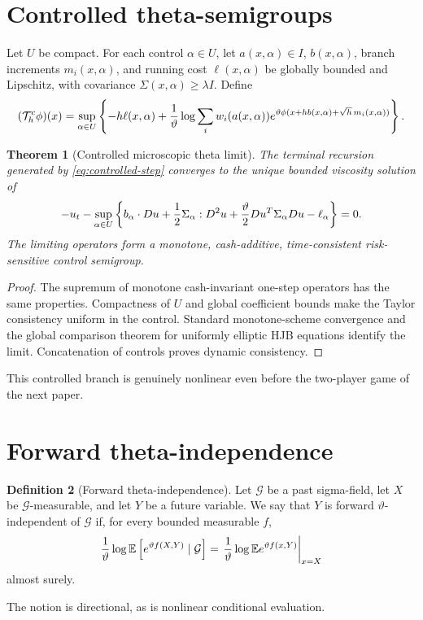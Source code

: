 \documentclass[11pt,reqno]{amsart}
\newtheorem{theorem}{Theorem}[section]
\theoremstyle{definition}
\newtheorem{definition}[theorem]{Definition}
\theoremstyle{remark}
\newcommand{\E}{\mathbb E}
\begin{document}
\section{Controlled theta-semigroups}

Let $U$ be compact.  For each control $\alpha\in U$, let
$a(x,\alpha)\in I$, $b(x,\alpha)$, branch increments $m_i(x,\alpha)$, and
running cost $\ell(x,\alpha)$ be globally bounded and Lipschitz, with covariance
$\Sigma(x,\alpha)\ge\lambda I$.  Define
\begin{equation}\label{eq:controlled-step}
 (\mathcal T_h^c\phi)(x)=
 \sup_{\alpha\in U}\left\{-h\ell(x,\alpha)
 +{1\over\vartheta}\log\sum_iw_i(a(x,\alpha))
 e^{\vartheta\phi(x+hb(x,\alpha)+\sqrt h\,m_i(x,\alpha))}
 \right\}.
\end{equation}

\begin{theorem}[Controlled microscopic theta limit]\label{thm:controlled}
The terminal recursion generated by \eqref{eq:controlled-step} converges to the
unique bounded viscosity solution of
\begin{equation}\label{eq:controlled-HJB}
 -u_t-\sup_{\alpha\in U}\left\{
 b_\alpha\cdot Du+{1\over2}\Sigma_\alpha:D^2u
 +{\vartheta\over2}Du^T\Sigma_\alpha Du-\ell_\alpha
 \right\}=0.
\end{equation}
The limiting operators form a monotone, cash-additive, time-consistent
risk-sensitive control semigroup.
\end{theorem}

\begin{proof}
The supremum of monotone cash-invariant one-step operators has the same
properties.  Compactness of $U$ and global coefficient bounds make the Taylor
consistency uniform in the control.  Standard monotone-scheme convergence and
the global comparison theorem for uniformly elliptic HJB equations identify
the limit.  Concatenation of controls proves dynamic consistency.
\end{proof}

This controlled branch is genuinely nonlinear even before the two-player game
of the next paper.

\section{Forward theta-independence}

\begin{definition}[Forward theta-independence]\label{def:theta-independence}
Let $\mathcal G$ be a past sigma-field, let $X$ be $\mathcal G$-measurable, and
let $Y$ be a future variable.  We say that $Y$ is forward
$\vartheta$-independent of $\mathcal G$ if, for every bounded measurable
$f$,
\begin{equation}\label{eq:theta-independence}
 {1\over\vartheta}\log\E
 \left[e^{\vartheta f(X,Y)}\mid\mathcal G\right]
 =\left.
 {1\over\vartheta}\log\E e^{\vartheta f(x,Y)}
 \right|_{x=X}
\end{equation}
almost surely.
\end{definition}
The notion is directional, as is nonlinear conditional evaluation.
\end{document}
